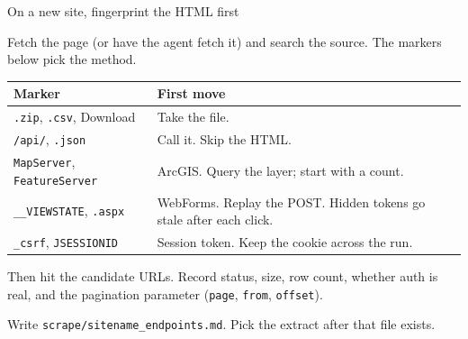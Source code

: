\documentclass[9pt,aspectratio=169]{beamer}
\begin{document}
\begin{frame}{On a new site, fingerprint the HTML first}

  Fetch the page (or have the agent fetch it) and search the source.
  The markers below pick the method.

  \vspace{0.25cm}
  \renewcommand{\arraystretch}{1.18}
  \footnotesize
  \begin{tabular}{@{}p{} p{}@{}}
    \toprule
    {\color{bhblue}\bfseries Marker} & {\color{bhblue}\bfseries First move} \\
    \midrule
    \texttt{.zip}, \texttt{.csv}, Download
      & Take the file. \\
    \texttt{/api/}, \texttt{.json}
      & Call it. Skip the HTML. \\
    \texttt{MapServer}, \texttt{FeatureServer}
      & ArcGIS. Query the layer; start with a count. \\
    \texttt{\_\_VIEWSTATE}, \texttt{.aspx}
      & WebForms. Replay the POST. Hidden tokens go stale after each click. \\
    \texttt{\_csrf}, \texttt{JSESSIONID}
      & Session token. Keep the cookie across the run. \\
    \bottomrule
  \end{tabular}

  \vspace{0.3cm}
  Then hit the candidate URLs. Record status, size, row count, whether auth is
  real, and the pagination parameter (\texttt{page}, \texttt{from}, \texttt{offset}).

  \vspace{0.12cm}
  Write \texttt{scrape/sitename\_endpoints.md}. Pick the extract after that file exists.

\end{frame}
\end{document}
